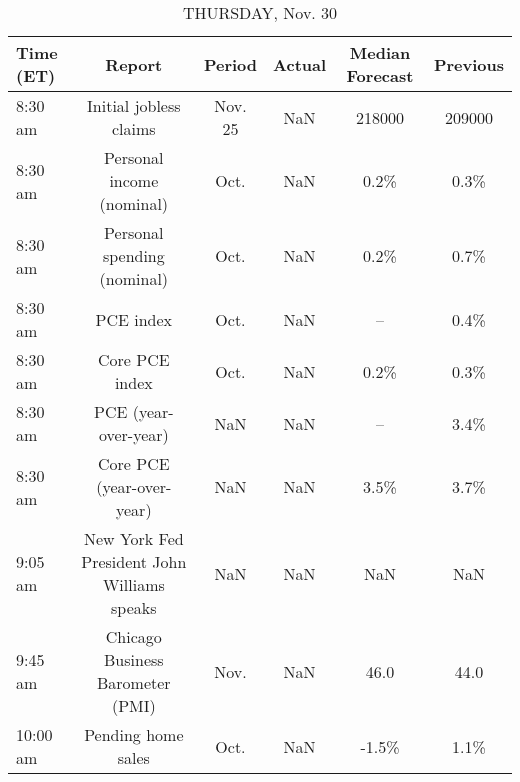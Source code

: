 \documentclass{article}%
\begin{document}
\begin{table}[htbp]%
\caption{THURSDAY, Nov. 30}%
\centering%
\begin{adjustbox}{width=1\textwidth}%
\begin{tabular}{lccccc}
\toprule
Time (ET) &                                      Report &  Period & Actual & Median Forecast & Previous \\
\midrule
  8:30 am &                      Initial jobless claims & Nov. 25 &    NaN &          218000 &   209000 \\
  8:30 am &                   Personal income (nominal) &    Oct. &    NaN &            0.2\% &     0.3\% \\
  8:30 am &                 Personal spending (nominal) &    Oct. &    NaN &            0.2\% &     0.7\% \\
  8:30 am &                                   PCE index &    Oct. &    NaN &              -- &     0.4\% \\
  8:30 am &                              Core PCE index &    Oct. &    NaN &            0.2\% &     0.3\% \\
  8:30 am &                        PCE (year-over-year) &     NaN &    NaN &              -- &     3.4\% \\
  8:30 am &                   Core PCE (year-over-year) &     NaN &    NaN &            3.5\% &     3.7\% \\
  9:05 am & New York Fed President John Williams speaks &     NaN &    NaN &             NaN &      NaN \\
  9:45 am &            Chicago Business Barometer (PMI) &    Nov. &    NaN &            46.0 &     44.0 \\
 10:00 am &                          Pending home sales &    Oct. &    NaN &           -1.5\% &     1.1\% \\
\bottomrule
\end{tabular}
%
\end{adjustbox}%
\end{table}

%
\end{document}
